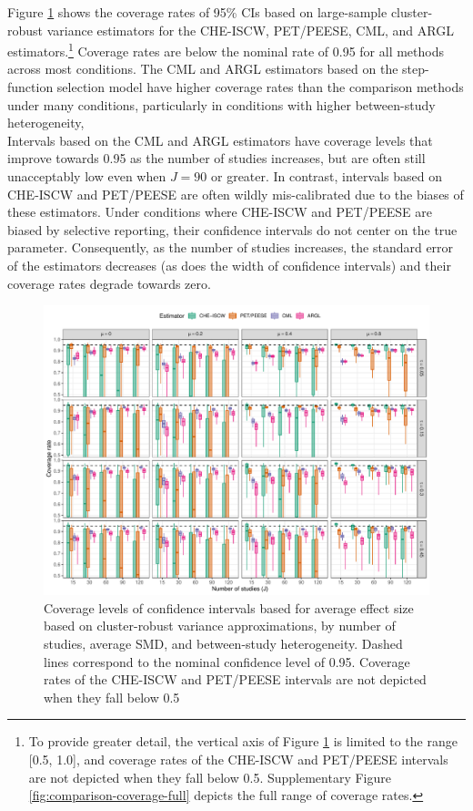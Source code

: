 \documentclass[
  american,
  man, donotrepeattitle,floatsintext]{apa7}
\begin{document}
Figure \ref{fig:comparison-coverage} shows the coverage rates of 95\% CIs based on large-sample cluster-robust variance estimators for the CHE-ISCW, PET/PEESE, CML, and ARGL estimators.\footnote{To provide greater detail, the vertical axis of Figure \ref{fig:comparison-coverage} is limited to the range {[}0.5, 1.0{]}, and coverage rates of the CHE-ISCW and PET/PEESE intervals are not depicted when they fall below 0.5. Supplementary Figure \ref{fig:comparison-coverage-full} depicts the full range of coverage rates.}
Coverage rates are below the nominal rate of 0.95 for all methods across most conditions.
The CML and ARGL estimators based on the step-function selection model have higher coverage rates than the comparison methods under many conditions, particularly in conditions with higher between-study heterogeneity,\\
Intervals based on the CML and ARGL estimators have coverage levels that improve towards 0.95 as the number of studies increases, but are often still unacceptably low even when \(J = 90\) or greater.
In contrast, intervals based on CHE-ISCW and PET/PEESE are often wildly mis-calibrated due to the biases of these estimators.
Under conditions where CHE-ISCW and PET/PEESE are biased by selective reporting, their confidence intervals do not center on the true parameter. Consequently, as the number of studies increases, the standard error of the estimators decreases (as does the width of confidence intervals) and their coverage rates degrade towards zero.

\begin{figure}
\includegraphics{step-function-selection-models-with-dependent-effects_files/figure-latex/comparison-coverage-1} \caption{Coverage levels of confidence intervals based for average effect size based on cluster-robust variance approximations, by number of studies, average SMD, and between-study heterogeneity. Dashed lines correspond to the nominal confidence level of 0.95. Coverage rates of the CHE-ISCW and PET/PEESE intervals are not depicted when they fall below 0.5}\label{fig:comparison-coverage}
\end{figure}
\end{document}
